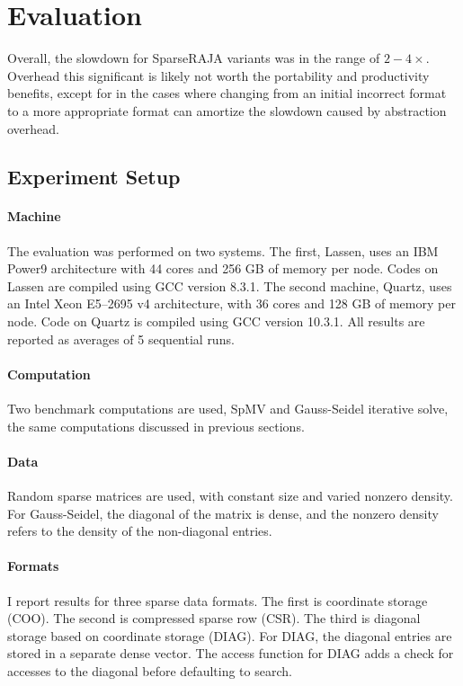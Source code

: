 \section{Evaluation}\label{sec:SparseEval}

Overall, the slowdown for SparseRAJA variants was in the range of $2-4\times$.
Overhead this significant is likely not worth the portability and productivity benefits, except for in the cases where changing from an initial incorrect format to a more appropriate format can amortize the slowdown caused by abstraction overhead.
\subsection{Experiment Setup}

\paragraph{Machine}
The evaluation was performed on two systems.
The first, Lassen, uses an IBM Power9 architecture with 44 cores and 256 GB of memory per node.
Codes on Lassen are compiled using GCC version 8.3.1.
The second machine, Quartz, uses an Intel Xeon E5--2695 v4 architecture, with 36 cores and 128 GB of memory per node.
Code on Quartz is compiled using GCC version 10.3.1.
All results are reported as averages of 5 sequential runs.

\paragraph{Computation}
Two benchmark computations are used, SpMV and Gauss-Seidel iterative solve, the same computations discussed in previous sections.

\paragraph{Data}
Random sparse matrices are used, with constant size and varied nonzero density.
For Gauss-Seidel, the diagonal of the matrix is dense, and the nonzero density refers to the density of the non-diagonal entries.

\paragraph{Formats}
I report results for three sparse data formats.
The first is coordinate storage (COO).
The second is compressed sparse row (CSR).
The third is diagonal storage based on coordinate storage (DIAG).
For DIAG, the diagonal entries are stored in a separate dense vector.
The access function for DIAG adds a check for accesses to the diagonal before defaulting to search.

